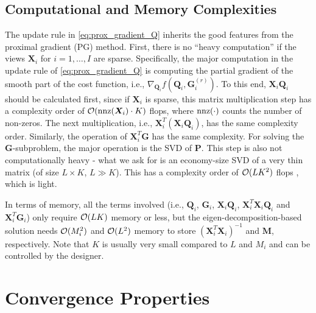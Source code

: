 \documentclass[10pt,journal]{IEEEtran}
\newcommand{\G}{\boldsymbol{G}}
\newcommand{\Q}{\boldsymbol{Q}}
\newcommand{\X}{\boldsymbol{X}}
\begin{document}
\subsection{Computational and Memory Complexities}
The update rule in \eqref{eq:prox_gradient_Q} inherits the good features from
the proximal gradient (PG) method.
First, there is no ``heavy computation'' if the views $\X_i$ for $i=1,\ldots,I$ are sparse. Specifically, the major computation in the update rule of \eqref{eq:prox_gradient_Q} is computing the partial gradient of the smooth part of the cost function, i.e., $\nabla_{\Q_i} f(\Q_i,\G_i^{(r)})$.
To this end, ${\bm X}_i{\bm Q}_i$ should be calculated first, since if ${\bm X}_i$ is sparse,
this matrix multiplication step has a complexity order of ${\cal O}({\rm nnz}({\bm X}_i)\cdot K)$ flops,
where ${\rm nnz}(\cdot)$ counts the number of non-zeros. The next multiplication, i.e., ${\bm X}_i^T({\bm X}_i{\bm Q}_i)$, has the same complexity order.
Similarly, the operation of $\X_i^T\G$ has the same complexity.
For solving the $\G$-subproblem, the major operation is the SVD of ${\bm P}$.
This step is also not computationally heavy - what we ask for is an economy-size SVD of a very thin matrix (of size $L\times K$, $L\gg K$).
This has a complexity order of ${\cal O}(LK^2)$ flops \cite{GHGolub1996}, which is light.

In terms of memory, all the terms involved (i.e., ${\bm Q}_i$, ${\bm G}_i$, ${\bm X}_i{\bm Q}_i$, ${\bm X}_i^T{\bm X}_i{\bm Q}_i$ and ${\bm X}_i^T{\bm G}_i$) only require ${\cal O}(LK)$ memory or less,
but the eigen-decomposition-based solution needs ${\cal O}(M_i^2)$ and ${\cal O}(L^2)$ memory to store $({\bm X}_i^T{\bm X}_i)^{-1}$ and ${\bm M}$, respectively. Note that $K$ is usually very small compared to $L$ and $M_i$ and can be controlled by the designer.


\section{Convergence Properties}
\end{document}
